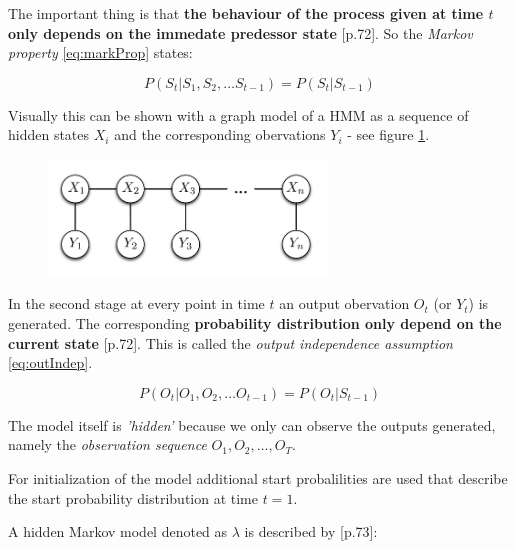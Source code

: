 The important thing is that \textbf{the behaviour of the process given at time $t$ only depends on the immedate predessor state} \cite{mm_pr}[p.72]. So the \emph{Markov property} \eqref{eq:markProp} states:

\begin{equation}
	P(S_t | S_1,S_2, \ldots S_{t-1}) = P(S_t | S_{t-1})
	\label{eq:markProp}
\end{equation}

Visually this can be shown with a graph model of a HMM as a sequence of hidden states $X_i$ and the corresponding obervations $Y_i$ - see figure \ref{fig:GraphModel}.

\begin{figure}[H]
	\centering
	
	\includegraphics[width=0.66\textwidth]{./Images/GraphModelHMM_1.png}
	\caption{ \cite{hmm_II}}
	\label{fig:GraphModel}
\end{figure}

In the second stage at every point in time $t$ an output obervation $O_t$ (or $Y_t$) is generated. The corresponding \textbf{probability distribution only depend on the current state} \cite{mm_pr}[p.72]. This is called the \emph{output independence assumption} \eqref{eq:outIndep}.

\begin{equation}
P(O_t | O_1,O_2, \ldots O_{t-1}) = P(O_t | S_{t-1})
\label{eq:outIndep}
\end{equation} 

The model itself is \emph{'hidden'} because we only can observe the outputs generated, namely the \emph{observation sequence} $O_1, O_2, \ldots,  O_T$.

For initialization of the model additional start probalilities are used that describe the start probability distribution at time $t=1$.

A hidden Markov model denoted as $\lambda$ is described by \cite{mm_pr}[p.73]:

